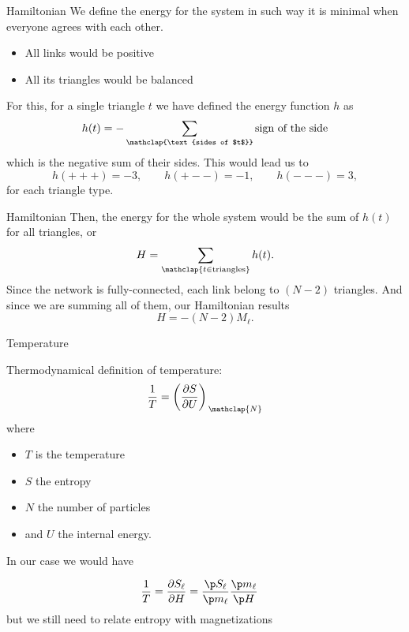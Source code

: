 
	
\begin{frame}{Hamiltonian}
	We define the energy for the system in such way it is minimal when everyone agrees with each other. 
\begin{itemize}
	\item All links would be positive
	\item All its triangles would be balanced 
\end{itemize}

For this, for a single triangle $t$ we have defined the energy function $h$ as
\begin{equation}
    h(t) = - \sum_{\mathclap{\text{sides of $t$}}} \text{sign of the side} 
\end{equation}
which is the negative sum of their sides. This would lead us to
\begin{equation}
        h(+++) = -3,\qquad
		h(+--) = -1,\qquad
		h(---) = 3,
    \label{eq:h_types}
\end{equation}
for each triangle type.\\[1em]
\end{frame}

\begin{frame}{Hamiltonian}
 Then, the energy for the whole system would be the sum of $h(t)$ for all triangles, or
 \begin{equation}
	H =	\sum_{\mathclap{t\in\text{triangles}}} h(t).
 \end{equation}
Since the network is fully-connected, each link belong to $(N-2)$ triangles. And since we are summing all of them, our Hamiltonian results 
\begin{equation}
	H = -(N-2)M_\ell.\label{eq:H_M}
\end{equation}
\end{frame}


\begin{frame}{Temperature}{\phantom{ }}

Thermodynamical definition of temperature:
\begin{equation}
    \frac{1}{T} = \left( \frac{\partial S}{\partial U} \right)_{\,\mathclap{N}} \label{eq:T_def}
\end{equation}
where 
\begin{itemize}
	\item  $T$ is the temperature
	\item $S$ the entropy
	\item $N$ the number of particles
	\item and $U$ the internal energy.
\end{itemize}
In our case we would have

\begin{align}
    \frac{1}{T} &=  \frac{\partial S_\ell}{\partial H}  = \frac{\p S_\ell}{\p m_\ell} \frac{\p m_\ell}{\p H}
\end{align}
but we still need to relate entropy with magnetizations
\end{frame}

